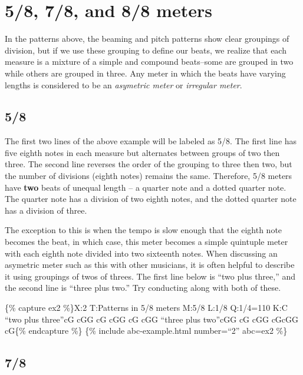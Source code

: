 \documentclass{book}
\begin{document}
\hypertarget{and-88-meters}{%
\section{5/8, 7/8, and 8/8 meters}\label{and-88-meters}}

In the patterns above, the beaming and pitch patterns show clear groupings of
division, but if we use these grouping to define our beats, we realize that
each measure is a mixture of a simple and compound beats--some are grouped in
two while others are grouped in three. Any meter in which the beats have
varying lengths is considered to be an \emph{asymetric meter} or
\emph{irregular meter}.

\hypertarget{section}{%
\subsection{5/8}\label{section}}

The first two lines of the above example will be labeled as 5/8. The first
line has five eighth notes in each measure but alternates between groups of
two then three. The second line reverses the order of the grouping to three
then two, but the number of divisions (eighth notes) remains the same.
Therefore, 5/8 meters have \textbf{two} beats of unequal length -- a quarter
note and a dotted quarter note. The quarter note has a division of two eighth
notes, and the dotted quarter note has a division of three.

The exception to this is when the tempo is slow enough that the eighth note
becomes the beat, in which case, this meter becomes a simple quintuple meter
with each eighth note divided into two sixteenth notes. When discussing an
asymetric meter such as this with other musicians, it is often helpful to
describe it using groupings of twos of threes. The first line below is ``two
plus three,'' and the second line is ``three plus two.'' Try conducting along
with both of these.

\{\% capture ex2 \%\}X:2 T:Patterns in 5/8 meters M:5/8 L:1/8 Q:1/4=110 K:C
``two plus three''cG cGG\textbar{} cG cGG\textbar{} cG cGG\textbar{]} ``three
plus two''cGG cG\textbar{} cGG cG\textbar cGG cG\textbar{]}\{\% endcapture
\%\} \{\% include abc-example.html number=``2'' abc=ex2 \%\}

\hypertarget{section-1}{%
\subsection{7/8}\label{section-1}}
\end{document}
